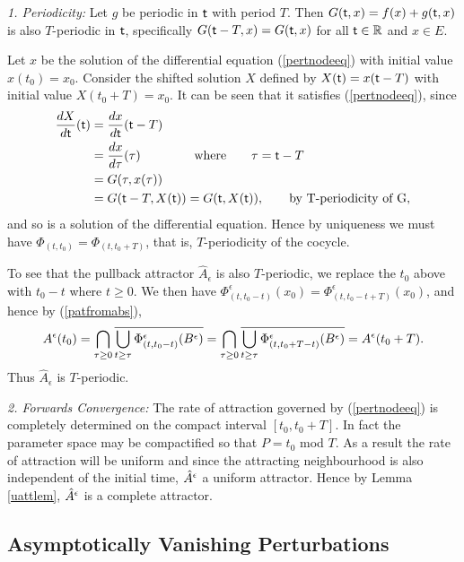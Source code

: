 \begin{prf}
{\em 1. Periodicity:} Let $g$ be periodic in $ \mathsf{\mathsf{t}}$ with period $T$. Then
$G( \mathsf{\mathsf{t}},x) = f(x) + g( \mathsf{\mathsf{t}},x)$ is also $T$-periodic in $ \mathsf{\mathsf{t}}$, specifically
$G( \mathsf{\mathsf{t}}-T,x) = G( \mathsf{\mathsf{t}},x)$ for all $ \mathsf{\mathsf{t}} \in \mathbb{R}$ and $x \in E$.

Let $x$ be the solution of the differential equation
(\ref{pertnodeeq}) with initial value $x(t_0) = x_0$. Consider
the shifted solution $X$ defined by $X( \mathsf{\mathsf{t}}) = x( \mathsf{\mathsf{t}}-T)$ with initial value
$X(t_0 + T) = x_0$. It can be seen that it satisfies
(\ref{pertnodeeq}), since
\begin{align*}
  \frac{dX}{d  \mathsf{\mathsf{t}}}( \mathsf{\mathsf{t}}) &= \frac{dx}{d  \mathsf{\mathsf{t}}}( \mathsf{\mathsf{t}}-T) \\
  &= \frac{dx}{d \tau}(\tau) \hspace{1.5cm} \text{where} \qquad \tau =
                 \mathsf{\mathsf{t}}-T  \\
  &= G(\tau,x(\tau)) \\
  &= G( \mathsf{\mathsf{t}}-T,X( \mathsf{\mathsf{t}})) = G( \mathsf{\mathsf{t}},X( \mathsf{\mathsf{t}})), \qquad \text{by T-periodicity of G}, \\
\end{align*}
and so is a solution of the differential equation. Hence by uniqueness we
must have $\Phi_{(t,t_0)} = \Phi_{(t,t_0+T)}$, that is, $T$-periodicity of
the cocycle.

To see that the pullback attractor $\hat{A}_{\epsilon}$ is also
$T$-periodic, we replace the $t_0$ above with $t_0-t$ where $t \geq 0$. We
then have $\Phi^{\epsilon}_{(t,t_0-t)}(x_0) = \Phi^{\epsilon}_{(t,t_0 - t +
T )} (x_0)$, and hence by (\ref{patfromabs}),
\[ A^{\epsilon}(t_0) = \bigcap_{\tau \geq 0} \overline{\bigcup_{t \geq \tau}
            \Phi^{\epsilon}_{(t,t_0-t)}(B^{\epsilon})} = \bigcap_{\tau
            \geq 0} \overline{\bigcup_{t \geq \tau}
            \Phi^{\epsilon}_{(t,t_0 + T -t)}(B^{\epsilon})} =
            A^{\epsilon}(t_0 + T). \]
Thus $\hat{A}_{\epsilon}$ is $T$-periodic.

{\em 2. Forwards Convergence:} The rate of attraction governed by
(\ref{pertnodeeq}) is completely determined on the compact interval
$[t_0, t_0 + T]$. In fact the parameter space may be compactified
so that $P = t_0$ mod $T$. As a result the rate of attraction will
be uniform and since the attracting neighbourhood is also
independent of the initial time, $\hat{A}^{\epsilon}$ a uniform attractor.
Hence by Lemma \ref{uattlem}, $\hat{A}^{\epsilon}$ is a complete
attractor.
\end{prf}

\subsection{Asymptotically Vanishing Perturbations}

